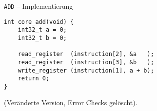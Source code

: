 \begin{frame}[fragile]{\texttt{ADD} -- Implementierung}
\begin{lstlisting}
int core_add(void) {
    int32_t a = 0; 
    int32_t b = 0;

    read_register  (instruction[2], &a   );
    read_register  (instruction[3], &b   );
    write_register (instruction[1], a + b);       
    return 0;
}
\end{lstlisting}
(Veränderte Version, Error Checks gelöscht).
\end{frame}



